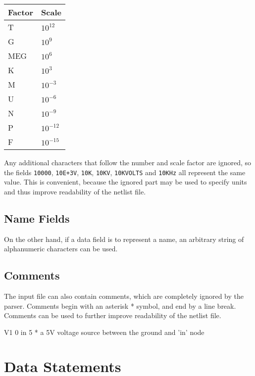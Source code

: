 \begin{center}
\begin{tabular}{|l|l|}	
	\hline
	Factor & Scale \\
	\hline \hline
	T & $ 10^{12} $ \\ \hline
	G & $10^9$ \\ \hline
	MEG & $ 10^6 $ \\ \hline
	K & $ 10^3 $ \\ \hline
	M & $ 10^{-3} $ \\ \hline
	U & $ 10^{-6} $ \\ \hline
	N & $ 10^{-9} $ \\ \hline
	P & $ 10^{-12} $ \\ \hline
	F & $ 10^{-15} $ \\
	\hline
\end{tabular}
\end{center}

Any additional characters that follow the number and scale factor are ignored, so the fields \texttt{10000}, \texttt{10E+3V}, \texttt{10K}, \texttt{10KV}, \texttt{10KVOLTS} and \texttt{10KHz} all represent the same value. This is convenient, because the ignored part may be used to specify units and thus improve readability of the netlist file.

\subsection{Name Fields}

On the other hand, if a data field is to represent a name, an arbitrary string of alphanumeric characters can be used.

\subsection{Comments}
The input file can also contain comments, which are completely ignored by the parser. Comments begin with an asterisk * symbol, and end by a line break. Comments can be used to further improve readability of the netlist file.

\begin{code}
V1 0 in 5 		* a 5V voltage source between the ground and 'in' node
\end{code}

\section{Data Statements}
\label{chap:spicecode-devices}

